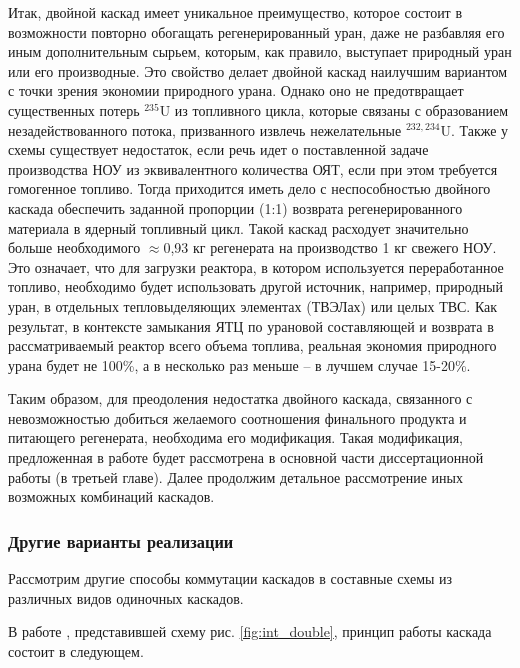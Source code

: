 Итак, двойной каскад имеет уникальное преимущество, которое состоит в возможности повторно обогащать регенерированный уран, даже не разбавляя его иным дополнительным сырьем, которым, как правило, выступает природный уран или его производные.
Это свойство делает двойной каскад наилучшим вариантом с точки зрения экономии природного урана.
Однако оно не предотвращает существенных потерь $^{235}$U из топливного цикла, которые связаны с образованием незадействованного потока, призванного извлечь нежелательные $^{232,234}$U.
Также у схемы существует недостаток, если речь идет о поставленной задаче производства НОУ из эквивалентного количества ОЯТ, если при этом требуется гомогенное топливо.
Тогда приходится иметь дело с неспособностью двойного каскада обеспечить заданной пропорции (1:1) возврата регенерированного материала в ядерный топливный цикл.
Такой каскад расходует значительно больше необходимого $\approx$0,93 кг регенерата на производство 1 кг свежего НОУ.
Это означает, что для загрузки реактора, в котором используется переработанное топливо, необходимо будет использовать другой источник, например, природный уран, в отдельных тепловыделяющих элементах (ТВЭЛах) или целых ТВС. 
Как результат, в контексте замыкания ЯТЦ по урановой составляющей и возврата в рассматриваемый реактор всего объема топлива, реальная экономия природного урана будет не 100\%, а в несколько раз меньше -- в лучшем случае 15-20\%.

Таким образом, для преодоления недостатка двойного каскада, связанного с невозможностью добиться желаемого соотношения финального продукта и питающего регенерата, необходима его модификация.
Такая модификация, предложенная в работе \cite{smirnovObogashchenieRegenerirovannogoUrana2018}
будет рассмотрена в основной части диссертационной работы (в третьей главе).
Далее продолжим детальное рассмотрение иных возможных комбинаций каскадов.

\subsubsection{Другие варианты реализации}
Рассмотрим другие способы коммутации каскадов в составные схемы из различных видов одиночных каскадов.

В работе \cite{palkinPurificationReprocessedUranium2016}, представившей схему рис. \ref{fig:int_double}, принцип работы каскада состоит в следующем.

